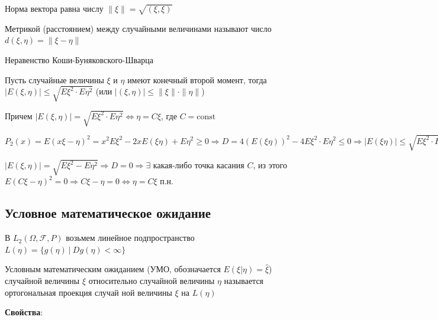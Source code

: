 \documentclass[12pt]{article}
\begin{document}
\Def Норма вектора равна числу $\|\xi\| = \sqrt{(\xi, \xi)}$

\Def Метрикой (расстоянием) между случайными величинами называют число $d(\xi, \eta) = \|\xi - \eta\|$

\hypertarget{cauchybunyakovskyschwarzinequality}{}

\begin{MyTheorem}
    \Ths Неравенство Коши-Буняковского-Шварца

    Пусть случайные величины $\xi$ и $\eta$ имеют конечный второй момент, тогда 
    $|E(\xi, \eta)| \leq \sqrt{E\xi^2 \cdot E\eta^2}$ (или $|(\xi, \eta)| \leq \|\xi\|\cdot\|\eta\|$)

    Причем $|E(\xi, \eta)| = \sqrt{E\xi^2 \cdot E\eta^2} \Longleftrightarrow \eta = C\xi$, где $C = \mathrm{const}$
\end{MyTheorem}

\begin{MyProof}
    $P_2(x) = E(x\xi - \eta)^2 = x^2 E\xi^2 - 2xE(\xi\eta) + E\eta^2 \geq 0 \Longrightarrow D = 4(E(\xi\eta))^2 - 
    4 E\xi^2 \cdot E\eta^2 \leq 0 \Longrightarrow |E(\xi\eta)| \leq \sqrt{E\xi^2 \cdot E\eta^2}$
    
    $|E(\xi, \eta)| = \sqrt{E\xi^2 - E\eta^2} \Longrightarrow D = 0 \Longrightarrow \exists$ какая-либо точка касания $C$, 
    из этого $E(C\xi - \eta)^2 = 0 \Longrightarrow C\xi - \eta = 0 \Longleftrightarrow \eta = C\xi \text{ п.н. }$
\end{MyProof}

\subsection{Условное математическое ожидание}

\hypertarget{conditionalexpectedvalue}{}

В $L_2(\Omega, \mathcal{F}, P)$ возьмем линейное подпространство $L(\eta) = \{g(\eta) \ | \ Dg(\eta) < \infty\}$

 Условным математическим ожиданием (УМО, обозначается $E(\xi|\eta) = \hat{\xi}$) случайной величины $\xi$
относительно случайной величины $\eta$ называется ортогональная проекция случай
ной величины $\xi$ на $L(\eta)$ 

\mediumvspace

\hypertarget{conditionalexpectedvalueproperties}{}

\textbf{Свойства}:
\end{document}
